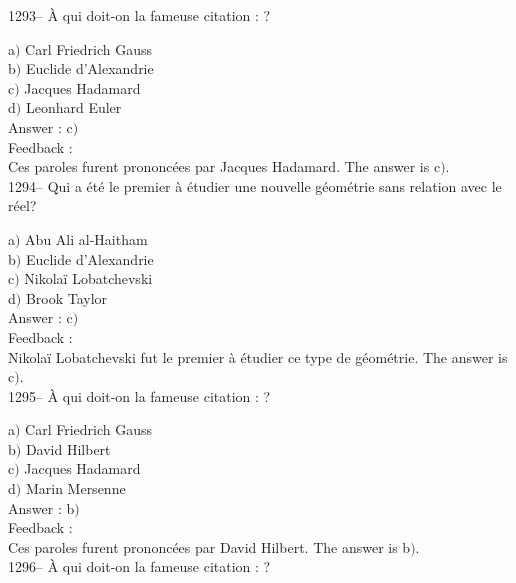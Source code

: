 \documentclass[letterpaper, 12pt]{article}
\begin{document}
1293-- \`A qui doit-on la fameuse citation : \fg?

a$)$ Carl Friedrich Gauss \\
b$)$ Euclide d'Alexandrie \\
c$)$ Jacques Hadamard \\
d$)$ Leonhard Euler\\

Answer : c$)$\\

Feedback : \\
Ces paroles furent prononc\'ees par Jacques Hadamard.
The answer is  c$)$.\\

1294-- Qui a \'et\'e le premier \`a \'etudier une nouvelle
g\'eom\'etrie sans relation avec le r\'eel?

a$)$ Abu Ali al-Haitham \\
b$)$ Euclide d'Alexandrie \\
c$)$ Nikola\"i Lobatchevski \\
d$)$ Brook Taylor\\

Answer : c$)$\\

Feedback : \\
Nikola\"i Lobatchevski fut le premier \`a \'etudier ce type de
g\'eom\'etrie.
The answer is  c$)$.\\

1295-- \`A qui doit-on la fameuse citation : \fg ?

a$)$ Carl Friedrich Gauss \\
b$)$ David Hilbert \\
c$)$ Jacques Hadamard \\
d$)$ Marin Mersenne\\

Answer : b$)$\\

Feedback : \\
Ces paroles furent prononc\'ees par David Hilbert.
The answer is  b$)$.\\

1296-- \`A qui doit-on la fameuse citation : \fg ?
\end{document}
